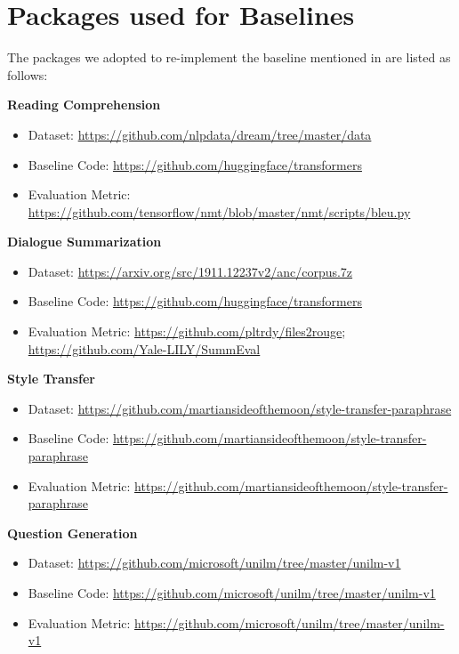 \section{Packages used for Baselines}
\label{sec:pkgs}

The packages we adopted to re-implement the baseline mentioned in  are listed as follows:%

\textbf{Reading Comprehension}
\begin{itemize}
	\item Dataset: \url{https://github.com/nlpdata/dream/tree/master/data}
	\item Baseline Code: \url{https://github.com/huggingface/transformers}
	\item Evaluation Metric: \url{https://github.com/tensorflow/nmt/blob/master/nmt/scripts/bleu.py}
\end{itemize}

\textbf{Dialogue Summarization}
\begin{itemize}
	\item Dataset: \url{https://arxiv.org/src/1911.12237v2/anc/corpus.7z}
	\item Baseline Code: \url{https://github.com/huggingface/transformers}
	\item Evaluation Metric: \url{https://github.com/pltrdy/files2rouge}; \url{https://github.com/Yale-LILY/SummEval}
\end{itemize}

\textbf{Style Transfer}
\begin{itemize}
	\item Dataset: \url{https://github.com/martiansideofthemoon/style-transfer-paraphrase}
	\item Baseline Code: \url{https://github.com/martiansideofthemoon/style-transfer-paraphrase}
	\item Evaluation Metric: \url{https://github.com/martiansideofthemoon/style-transfer-paraphrase}
\end{itemize}

\textbf{Question Generation}
\begin{itemize}
	\item Dataset: \url{https://github.com/microsoft/unilm/tree/master/unilm-v1}
	\item Baseline Code: \url{https://github.com/microsoft/unilm/tree/master/unilm-v1}
	\item Evaluation Metric: \url{https://github.com/microsoft/unilm/tree/master/unilm-v1}
\end{itemize}

